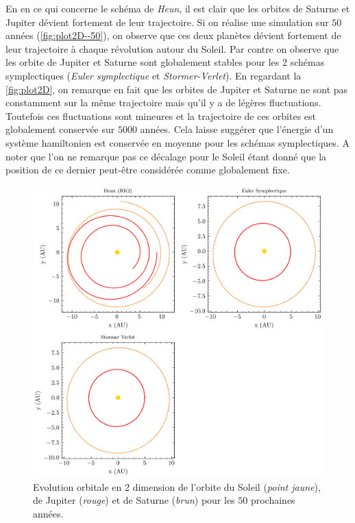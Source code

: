 \documentclass[11pt,twoside=semi,openright,numbers=noenddot]{article}
\begin{document}
En en ce qui concerne le schéma de \emph{Heun}, il est clair que les orbites de Saturne et Jupiter dévient fortement de leur trajectoire. Si on réalise une simulation sur $50$ années (\autoref{fig:plot2D--50}), on observe que ces deux planètes dévient fortement de leur trajectoire à chaque révolution autour du Soleil.
Par contre on observe que les orbite de Jupiter et Saturne sont globalement stables pour les 2 schémas symplectiques (\emph{Euler symplectique} et \emph{Stormer-Verlet}). En regardant la \autoref{fig:plot2D}, on remarque en fait que les orbites de Jupiter et Saturne ne sont pas constamment sur la même trajectoire mais qu'il y a de légères fluctuations. Toutefois ces fluctuations sont mineures et la trajectoire de ces orbites est globalement conservée sur $5000$ années. Cela laisse suggérer que l'énergie d'un système hamiltonien est conservée en moyenne pour les schémas symplectiques. A noter que l'on ne remarque pas ce décalage pour le Soleil étant donné que la position de ce dernier peut-être considérée comme globalement fixe.

\begin{figure}[H]
  \centering
  \includegraphics{figures/50_years/orbital-plot2d.png}
  \caption{Evolution orbitale en 2 dimension de l'orbite du Soleil (\emph{point jaune}), de Jupiter (\emph{rouge}) et de Saturne (\emph{brun}) pour les $50$ prochaines années.}
  \label{fig:plot2D--50}
\end{figure}
\end{document}
